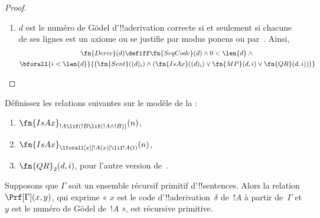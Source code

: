 \documentclass[../../../include/open-logic-section]{subfiles}
\begin{document}
\begin{proof}
\begin{enumerate}
\begin{multline*}
    \concat \Gn{)} \land {}\\
    (d)_j = \Gn{(} \concat b \concat
    \Gn{\lif} \concat \fn{Subst}(a,c,x) \concat \Gn{)} \land {}\\ \fn{Sent}(b)
    \land \fn{Sent}(\fn{Subst}(a,c,x)) \land {} \bforall{k <
      \len{b}}{(b)_k \neq (c)_0}\land{}\\ \fn{Frm}(a)\land\bforall{k<\len{a}}{(a)_k\neq(c)_0})
  \end{multline*}
  Nous supposons ici que $c$ et $x$ sont les numéros de G\"odel
  de la constante et de la variable considérées comme des termes,
  et non les codes de leurs seuls symboles. Pour vérifier que $x$
  est la seule variable qui puisse être libre dans~$!A(x)$, nous
  testons si $\Subst{!A(x)}{c}{x}$ est !!a{sentence}; nous imposons
  aussi que le code de chaque symbole de~$!B$ diffère du code
  $(c)_0$ du symbole de~$c$.

  Nous laissons en exercice l'autre version de~\QR.
\item $d$ est le numéro de G\"odel d'!!a{derivation} correcte si et
  seulement si chacune de ses lignes est un axiome ou se justifie
  par modus ponens ou par~\QR. Ainsi,
  \begin{multline*}
  \fn{Deriv}(d) \defiff \fn{SeqCode}(d)\land0<\len{d}\land{}\\
  \bforall{i<\len{d}}{\bigl(\fn{Sent}((d)_i)\land
    (\fn{IsAx}((d)_i)\lor\fn{MP}(d,i)\lor\fn{QR}(d,i))\bigr)}
  \end{multline*}
\end{enumerate}
\end{proof}

\begin{prob}
Définissez les relations suivantes sur le modèle de la
 :
\begin{enumerate}
\item $\fn{IsAx}_{!A \lif (!B \lif (!A \land !B))}(n)$,
\item $\fn{IsAx}_{\lforall[x][!A(x)] \lif !A(t)}(n)$,
\item $\fn{QR}_{2}(d, i)$, pour l'autre version de~\QR.
\end{enumerate}
\end{prob}

\begin{prop}
Supposons que $\Gamma$ soit un ensemble récursif primitif
d'!!{sentence}s. Alors la relation $\Prf[\Gamma](x, y)$, qui
exprime « $x$ est le code d'!!a{derivation}~$\delta$ de~$!A$ à
partir de~$\Gamma$ et $y$ est le numéro de G\"odel de~$!A$ »,
est récursive primitive.
\end{prop}
\end{document}
